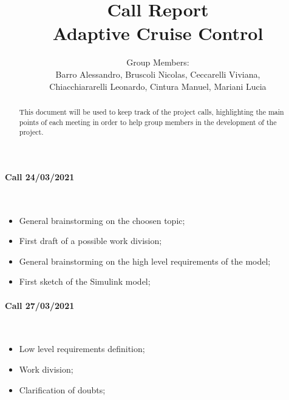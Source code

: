 \documentclass[12pt,a4paper]{report}
\begin{document}
	
	\author{Group Members:\\
		Barro Alessandro, Bruscoli Nicolas, Ceccarelli Viviana, \\
		 Chiacchiararelli Leonardo, Cintura Manuel, Mariani Lucia\\
		 }
	\title{Call Report\\
	Adaptive Cruise Control}
	\maketitle
	
\begin{abstract}
	
	This document will be used to keep track of the project calls, highlighting the main points of each meeting in order to help group members in the development of the project.
	
\end{abstract}

\paragraph{Call 24/03/2021 \\}~

\begin{itemize}
	\item General brainstorming on the choosen topic;
	
	\item First draft of a possible work division;
	
	\item General brainstorming on the high level requirements of the model;
	
	\item First sketch of the Simulink model;
\end{itemize}

\paragraph{Call 27/03/2021 \\}~

\begin{itemize}
	\item Low level requirements definition;
	
	\item Work division;
	
	\item Clarification of doubts;
	
\end{itemize}
\end{document}
